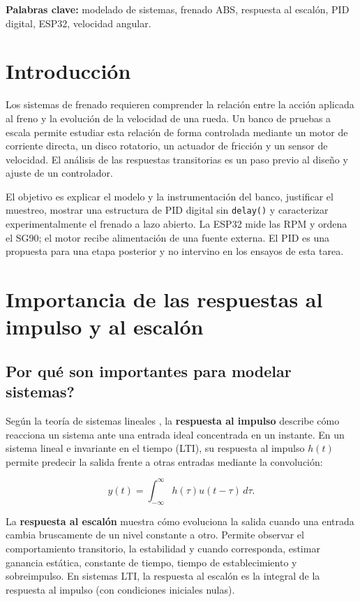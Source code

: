 \documentclass[9pt,a4paper,twocolumn]{extarticle}
\begin{document}
\textbf{Palabras clave:} modelado de sistemas, frenado ABS, respuesta al
escalón, PID digital, ESP32, velocidad angular.

\section{Introducción}\label{introducciuxf3n}

Los sistemas de frenado requieren comprender la relación entre la acción
aplicada al freno y la evolución de la velocidad de una rueda. Un banco
de pruebas a escala permite estudiar esta relación de forma controlada
mediante un motor de corriente directa, un disco rotatorio, un actuador
de fricción y un sensor de velocidad. El análisis de las respuestas
transitorias es un paso previo al diseño y ajuste de un controlador.

El objetivo es explicar el modelo y la instrumentación del banco,
justificar el muestreo, mostrar una estructura de PID digital sin
\texttt{delay()} y caracterizar experimentalmente el frenado a lazo
abierto. La ESP32 mide las RPM y ordena el SG90; el motor recibe
alimentación de una fuente externa. El PID es una propuesta para una
etapa posterior y no intervino en los ensayos de esta tarea.

\section{Importancia de las respuestas al impulso y al
escalón}\label{importancia-de-las-respuestas-al-impulso-y-al-escaluxf3n}

\subsection{\textquestiondown{}Por qué son importantes para modelar
sistemas?}\label{por-quuxe9-son-importantes-para-modelar-sistemas}

Según la teoría de sistemas lineales \cite{ogata2010,franklin2015}, la \textbf{respuesta al impulso} describe cómo reacciona un sistema ante
una entrada ideal concentrada en un instante. En un sistema lineal e
invariante en el tiempo (LTI), su respuesta al impulso \(h(t)\)
permite predecir la salida frente a otras entradas mediante la
convolución:

\[
y(t)=\int_{-\infty}^{\infty}h(\tau)u(t-\tau)\,d\tau.
\]

La \textbf{respuesta al escalón} muestra cómo evoluciona la salida
cuando una entrada cambia bruscamente de un nivel constante a otro.
Permite observar el comportamiento transitorio, la estabilidad y cuando
corresponda, estimar ganancia estática, constante de tiempo, tiempo de
establecimiento y sobreimpulso. En sistemas LTI, la respuesta al escalón
es la integral de la respuesta al impulso (con condiciones iniciales
nulas).
\end{document}
